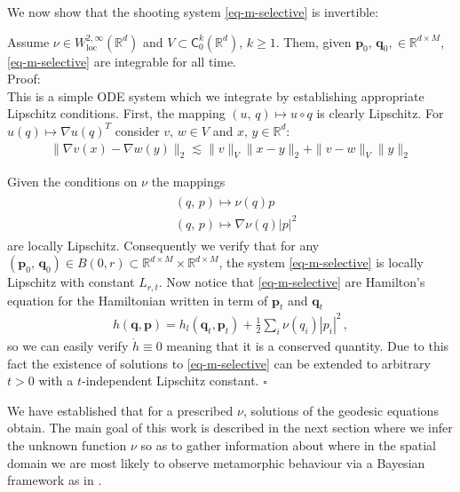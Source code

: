 \documentclass[runningheads]{llncs}
\newcommand{\norm}[2]{\| #1 \|_{ #2 }}
\newcommand{\vnorm}[1]{\norm{ #1 }{V}}
\newcommand{\ltwonorm}[1]{\norm{ #1 }{2}}
\newcommand{\Rd}{\mathbb{R}^{d}}
\newcommand{\RdM}{\mathbb{R}^{d\times M}}
\begin{document}
We now show that the shooting system \eqref{eq-m-selective} is invertible:
\begin{theorem}
Assume $\nu \in W^{2, \infty}_\text{loc}(\Rd)$ and
$V\subset\textsf{C}_0^k(\Rd)$, $k\geq 1$. Them, given $\mathbf p_0,\,\mathbf
q_0, \in \RdM$, \eqref{eq-m-selective} are integrable for all time.\\

Proof:\\

This is a simple ODE system which we integrate by establishing appropriate
Lipschitz conditions. First, the mapping $(u,\,q)\mapsto u\circ q$ is clearly 
Lipschitz. For $u(q)\mapsto\nabla u(q)^T$ consider $v,\,w \in V$ and
$x,\,y\in\Rd$:
\begin{align}
\ltwonorm{\nabla v(x) - \nabla w(y)} \lesssim \vnorm{v} \ltwonorm{x-y} + \vnorm{v-w}\ltwonorm{y}
\end{align}

Given the conditions on $\nu$ the mappings
\begin{align}
  \begin{split}
    & (q,\,p)\mapsto \nu(q)p\\
    &(q,\,p)\mapsto \nabla \nu(q)|p|^2
  \end{split}\label{nu_maps}
\end{align}
are locally Lipschitz. Consequently we verify that for any $(\mathbf
p_0,\,\mathbf q_0)\in B(0,r)\subset \RdM\times\RdM$, the system
\eqref{eq-m-selective} is locally Lipschitz with constant $L_{r,t}$.
Now notice that \eqref{eq-m-selective} are Hamilton's equation for the
Hamiltonian written in term of $\mathbf p_t$ and $\mathbf q_t$
\begin{align}
  h(\mathbf q, \mathbf p) = h_l(\mathbf q_t,\mathbf p_t)+\frac12\sum_i\nu(q_i) |p_i|^2\,,  
\end{align}
so we can easily verify $\dot h \equiv 0$ meaning that it is a conserved
quantity. Due to this fact the existence of solutions to \eqref{eq-m-selective}
can be extended to arbitrary $t>0$ with a $t$-independent Lipschitz constant.
{\hfill $\square$}
\end{theorem}

We have established that for a prescribed $\nu$, solutions of the geodesic
equations obtain. The main goal of this work is described in the next section
where we infer the unknown function $\nu$ so as to gather information about
where in the spatial domain we are most likely to observe metamorphic behaviour
via a Bayesian framework as in \cite{dashti2017bayesian}.
\end{document}
